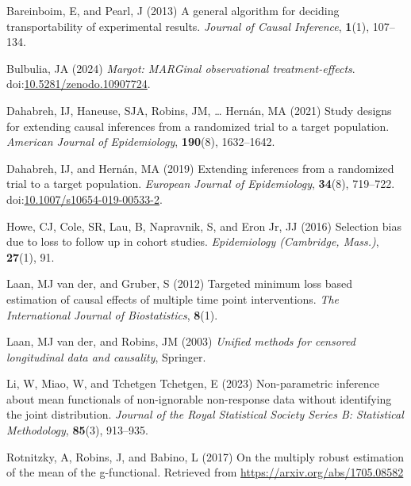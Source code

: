 \documentclass[
  singlecolumn]{article}
\newlength{\cslhangindent}
\newenvironment{CSLReferences}[2] %
 {\begin{list}{}{%
  \setlength{\itemindent}{0pt}
  \setlength{\leftmargin}{0pt}
  \setlength{\parsep}{0pt}
  \ifodd #1
   \setlength{\leftmargin}{\cslhangindent}
   \setlength{\itemindent}{-1\cslhangindent}
  \fi
  \setlength{\itemsep}{#2\baselineskip}}}
 {\end{list}}
\begin{document}
\label{refs}
\begin{CSLReferences}{1}{0}
Bareinboim, E, and Pearl, J (2013) A general algorithm for deciding
transportability of experimental results. \emph{Journal of Causal
Inference}, \textbf{1}(1), 107--134.

Bulbulia, JA (2024) \emph{Margot: MARGinal observational
treatment-effects}.
doi:\href{https://doi.org/10.5281/zenodo.10907724}{10.5281/zenodo.10907724}.

Dahabreh, IJ, Haneuse, SJA, Robins, JM, \ldots{} Hernán, MA (2021) Study
designs for extending causal inferences from a randomized trial to a
target population. \emph{American Journal of Epidemiology},
\textbf{190}(8), 1632--1642.

Dahabreh, IJ, and Hernán, MA (2019) Extending inferences from a
randomized trial to a target population. \emph{European Journal of
Epidemiology}, \textbf{34}(8), 719--722.
doi:\href{https://doi.org/10.1007/s10654-019-00533-2}{10.1007/s10654-019-00533-2}.

Howe, CJ, Cole, SR, Lau, B, Napravnik, S, and Eron Jr, JJ (2016)
Selection bias due to loss to follow up in cohort studies.
\emph{Epidemiology (Cambridge, Mass.)}, \textbf{27}(1), 91.

Laan, MJ van der, and Gruber, S (2012) Targeted minimum loss based
estimation of causal effects of multiple time point interventions.
\emph{The International Journal of Biostatistics}, \textbf{8}(1).

Laan, MJ van der, and Robins, JM (2003) \emph{Unified methods for
censored longitudinal data and causality}, Springer.

Li, W, Miao, W, and Tchetgen Tchetgen, E (2023) Non-parametric inference
about mean functionals of non-ignorable non-response data without
identifying the joint distribution. \emph{Journal of the Royal
Statistical Society Series B: Statistical Methodology}, \textbf{85}(3),
913--935.

Rotnitzky, A, Robins, J, and Babino, L (2017) On the multiply robust
estimation of the mean of the g-functional. Retrieved from
\url{https://arxiv.org/abs/1705.08582}


\end{CSLReferences}
\end{document}
